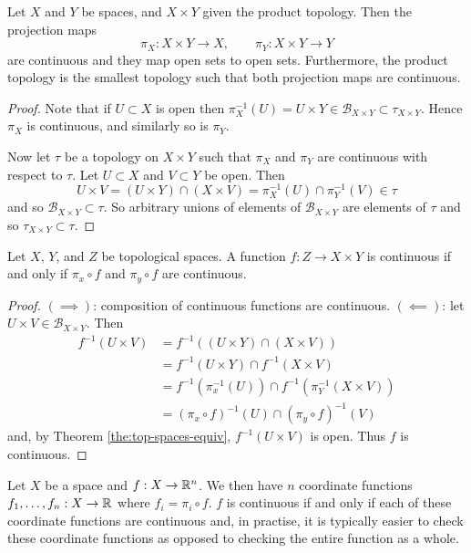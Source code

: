 
\begin{proposition}[]
	Let $X$ and $Y$ be spaces, and $X \times Y$ given the product topology.
	Then the projection maps
	\[
		\pi_X: X \times Y \to X, \qquad
		\pi_Y: X \times Y \to Y
	\]
	are continuous and they map open sets to open sets.
	Furthermore, the product topology is the smallest topology such that both
	projection maps are continuous.
\end{proposition}

\begin{proof}
	Note that if $U \subset X$ is open then
	$\pi^{-1}_X(U) 
	= U \times Y \in \mathcal B_{X \times Y} 
	\subset \tau_{X \times Y}$.
	Hence $\pi_X$ is continuous, and similarly so is
	$\pi_Y$.
	
	Now let $\tau$ be a topology on $X \times Y$ such that
	$\pi_X$ and $\pi_Y$ are continuous with respect to $\tau$.
	Let $U \subset X$ and $V \subset Y$ be open. 
	Then
	\[
		U \times V
		= (U \times Y) \cap (X \times V)
		= \pi_X^{-1} (U) \cap \pi_Y^{-1}(V)
		\in \tau
	\]
	and so $\mathcal B_{X \times Y} \subset \tau$.
	So arbitrary unions of elements of $\mathcal B_{X \times Y}$
	are elements of $\tau$ and so $\tau_{X \times Y} \subset \tau$.
\end{proof}

\begin{proposition}[]
	Let $X$, $Y$, and $Z$ be topological spaces.
	A function $f: Z \to X \times Y$ is continuous
	if and only if
	$\pi_x \circ f$ and $\pi_y \circ f$ are continuous.
\end{proposition}

\begin{proof}
	$(\implies)$: composition of continuous functions are continuous.
	$(\impliedby)$: let $U \times V \in \mathcal B_{X \times Y}$.
	Then
	\begin{align*}
		f^{-1}(U \times V)
		&= f^{-1}\left( (U \times Y) \cap (X \times V) \right) \\
		&= f^{-1}(U \times Y) \cap f^{-1}(X \times V) \\
		&= f^{-1}(\pi_x^{-1}(U)) \cap f^{-1}(\pi_Y^{-1}(X \times V)) \\
		&= (\pi_x \circ f)^{-1}(U) \cap (\pi_y \circ f)^{-1}(V)
	\end{align*}
	and, by Theorem \ref{the:top-spaces-equiv}, $f^{-1}(U \times V)$
	is open.
	Thus $f$ is continuous.
\end{proof}

\begin{example}[]
	Let $X$ be a space and $f: X \to \mathbb{R}^n$.
	We then have $n$ coordinate functions 
	$f_1, \ldots, f_n: X \to \mathbb{R}$
	where $f_i = \pi_i \circ f$.
	$f$ is continuous if and only if each of these coordinate functions
	are continuous and, in practise, it is typically easier to check
	these coordinate functions as opposed to checking the entire function
	as a whole.
\end{example}

